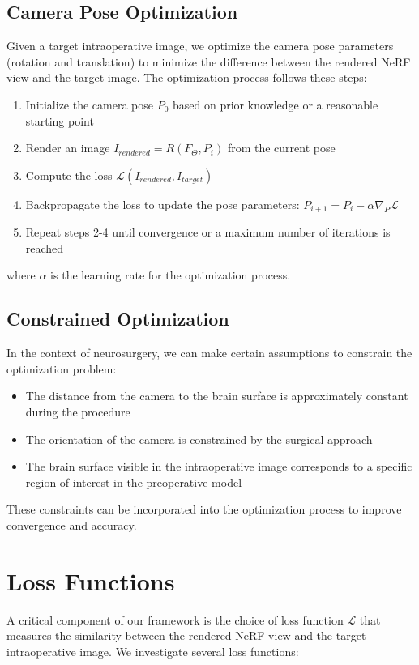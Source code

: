 \subsection{Camera Pose Optimization}
Given a target intraoperative image, we optimize the camera pose parameters (rotation and translation) to minimize the difference between the rendered NeRF view and the target image. The optimization process follows these steps:

\begin{enumerate}
    \item Initialize the camera pose $P_0$ based on prior knowledge or a reasonable starting point
    \item Render an image $I_{rendered} = R(F_\Theta, P_i)$ from the current pose
    \item Compute the loss $\mathcal{L}(I_{rendered}, I_{target})$
    \item Backpropagate the loss to update the pose parameters: $P_{i+1} = P_i - \alpha \nabla_P \mathcal{L}$
    \item Repeat steps 2-4 until convergence or a maximum number of iterations is reached
\end{enumerate}

where $\alpha$ is the learning rate for the optimization process.

\subsection{Constrained Optimization}
In the context of neurosurgery, we can make certain assumptions to constrain the optimization problem:

\begin{itemize}
    \item The distance from the camera to the brain surface is approximately constant during the procedure
    \item The orientation of the camera is constrained by the surgical approach
    \item The brain surface visible in the intraoperative image corresponds to a specific region of interest in the preoperative model
\end{itemize}

These constraints can be incorporated into the optimization process to improve convergence and accuracy.

\section{Loss Functions}
A critical component of our framework is the choice of loss function $\mathcal{L}$ that measures the similarity between the rendered NeRF view and the target intraoperative image. We investigate several loss functions:

